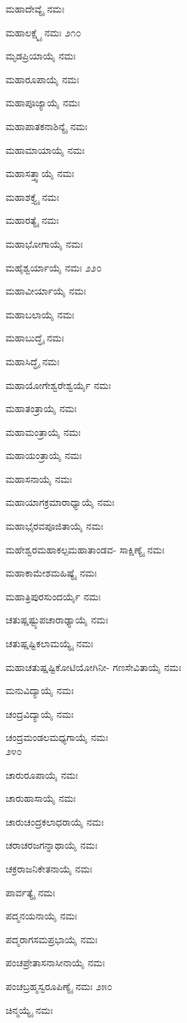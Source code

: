 ಮಹಾದೇವ್ಯೈ ನಮಃ

ಮಹಾಲಕ್ಷ್ಮೈ ನಮಃ \num{೨೧೦}

ಮೃಡಪ್ರಿಯಾಯೈ ನಮಃ

ಮಹಾರೂಪಾಯೈ ನಮಃ

ಮಹಾಪೂಜ್ಯಾಯೈ ನಮಃ

ಮಹಾಪಾತಕನಾಶಿನ್ಯೈ ನಮಃ

ಮಹಾಮಾಯಾಯೈ ನಮಃ

ಮಹಾಸತ್ತ್ವಾಯೈ ನಮಃ

ಮಹಾಶಕ್ತ್ಯೈ ನಮಃ

ಮಹಾರತ್ಯೈ ನಮಃ

ಮಹಾಭೋಗಾಯೈ ನಮಃ

ಮಹೈಶ್ವರ್ಯಾಯೈ ನಮಃ \num{೨೨೦}

ಮಹಾವೀರ್ಯಾಯೈ ನಮಃ

ಮಹಾಬಲಾಯೈ ನಮಃ

ಮಹಾಬುದ್ಧೈ ನಮಃ

ಮಹಾಸಿದ್ಧೈ ನಮಃ

ಮಹಾಯೋಗೇಶ್ವರೇಶ್ವರ್ಯೈ ನಮಃ

ಮಹಾತಂತ್ರಾಯೈ ನಮಃ

ಮಹಾಮಂತ್ರಾಯೈ ನಮಃ

ಮಹಾಯಂತ್ರಾಯೈ ನಮಃ

ಮಹಾಸನಾಯೈ ನಮಃ

ಮಹಾಯಾಗಕ್ರಮಾರಾಧ್ಯಾಯೈ ನಮಃ

ಮಹಾಭೈರವಪೂಜಿತಾಯೈ ನಮಃ

ಮಹೇಶ್ವರಮಹಾಕಲ್ಪಮಹಾತಾಂಡವ- ಸಾಕ್ಷಿಣ್ಯೈ ನಮಃ

ಮಹಾಕಾಮೇಶಮಹಿಷ್ಯೈ ನಮಃ

ಮಹಾತ್ರಿಪುರಸುಂದರ್ಯೈ ನಮಃ

ಚತುಷ್ಷಷ್ಟ್ಯುಪಚಾರಾಢ್ಯಾಯೈ ನಮಃ

ಚತುಷ್ಷಷ್ಟಿಕಲಾಮಯ್ಯೈ ನಮಃ

ಮಹಾಚತುಷ್ಷಷ್ಟಿಕೋಟಿಯೋಗಿನೀ- ಗಣಸೇವಿತಾಯೈ ನಮಃ

ಮನುವಿದ್ಯಾಯೈ ನಮಃ

ಚಂದ್ರವಿದ್ಯಾಯೈ ನಮಃ

ಚಂದ್ರಮಂಡಲಮಧ್ಯಗಾಯೈ ನಮಃ\\\num{೨೪೦}

ಚಾರುರೂಪಾಯೈ ನಮಃ

ಚಾರುಹಾಸಾಯೈ ನಮಃ

ಚಾರುಚಂದ್ರಕಲಾಧರಾಯೈ ನಮಃ

ಚರಾಚರಜಗನ್ನಾಥಾಯೈ ನಮಃ

ಚಕ್ರರಾಜನಿಕೇತನಾಯೈ ನಮಃ

ಪಾರ್ವತ್ಯೈ ನಮಃ

ಪದ್ಮನಯನಾಯೈ ನಮಃ

ಪದ್ಮರಾಗಸಮಪ್ರಭಾಯೈ ನಮಃ

ಪಂಚಪ್ರೇತಾಸನಾಸೀನಾಯೈ ನಮಃ

ಪಂಚಬ್ರಹ್ಮಸ್ವರೂಪಿಣ್ಯೈ ನಮಃ \num{೨೫೦}

ಚಿನ್ಮಯ್ಯೈ ನಮಃ

